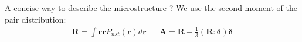 \documentclass{sintefbeamer}
\begin{document}
\begin{frame}
  {A concise way to describe the microstructure ? }
\footnotesize
  We use the second moment of the pair distribution: 
  \begin{align*}
    \textbf{R} = \int \textbf{rr} P_{nst}(\textbf{r}) d\textbf{r}
    &&
    \textbf{A} = 
    \textbf{R} - \frac{1}{3}(\textbf{R}: \bm\delta) \bm\delta
  \end{align*}

    


\end{frame}
\end{document}
